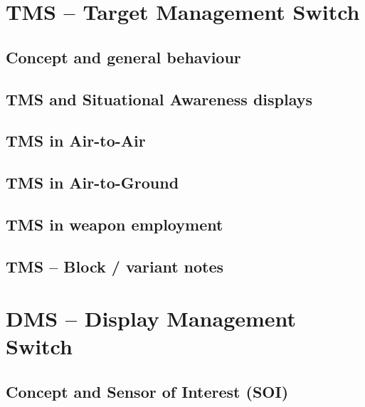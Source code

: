 \documentclass[11pt,a4paper]{article}
\begin{document}
\section{TMS -- Target Management Switch}

\subsection{Concept and general behaviour}



\subsection{TMS and Situational Awareness displays}



\subsection{TMS in Air-to-Air}



\subsection{TMS in Air-to-Ground}



\subsection{TMS in weapon employment}



\subsection{TMS -- Block / variant notes}


\section{DMS -- Display Management Switch}

\subsection{Concept and Sensor of Interest (SOI)}
\end{document}
